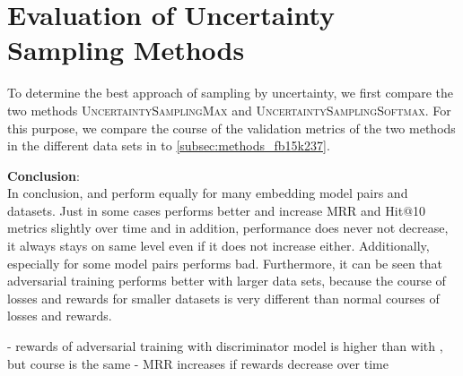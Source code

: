 \section{Evaluation of Uncertainty Sampling Methods}
\label{ch:evaluation:sec:evaluation_methods}

To determine the best approach of sampling by uncertainty, we first compare the two methods \textsc{UncertaintySamplingMax} and \textsc{UncertaintySamplingSoftmax}.
For this purpose, we compare the course of the validation metrics of the two methods in the different data sets in  to \ref{subsec:methods_fb15k237}.









\textbf{Conclusion}:\\
In conclusion, \usmax and \ussoftmax perform equally for many embedding model pairs and datasets.
Just in some cases \ussoftmax performs better and increase MRR and Hit@10 metrics slightly over time and in addition, performance does never not decrease, it always stays on same level even if it does not increase either.
Additionally, especially for some model pairs \usmax performs bad.
Furthermore, it can be seen that adversarial training performs better with larger data sets, because the course of losses and rewards for smaller datasets is very different than normal courses of losses and rewards.


- rewards of adversarial training with \transe discriminator model is higher than with \transd, but course is the same
- MRR increases if rewards decrease over time

